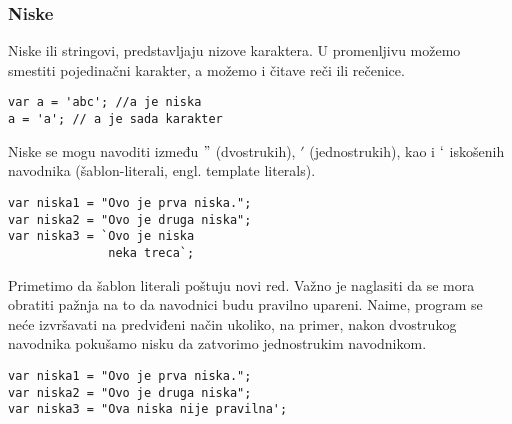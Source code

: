 \subsubsection{Niske}
Niske ili stringovi, predstavljaju nizove karaktera. U promenljivu možemo smestiti pojedinačni karakter, a možemo i čitave reči ili rečenice. \\
\begin{lstlisting}[backgroundcolor = \color{lightgray}, breaklines=true]
var a = 'abc'; //a je niska
a = 'a'; // a je sada karakter
\end{lstlisting}
Niske se mogu navoditi između $"$ (dvostrukih), $'$ (jednostrukih), kao i $`$ iskošenih navodnika (šablon-literali, engl. template literals).  
\begin{lstlisting}[backgroundcolor = \color{lightgray}, breaklines=true]
var niska1 = "Ovo je prva niska.";
var niska2 = "Ovo je druga niska";
var niska3 = `Ovo je niska
              neka treca`;
\end{lstlisting}
Primetimo da šablon literali poštuju novi red. Važno je naglasiti da se mora obratiti pažnja na to da navodnici budu pravilno upareni. Naime, program se neće izvršavati na predviđeni način ukoliko, na primer, nakon dvostrukog navodnika pokušamo nisku da zatvorimo jednostrukim navodnikom.
\begin{lstlisting}[backgroundcolor = \color{lightgray}, breaklines=true]
var niska1 = "Ovo je prva niska.";
var niska2 = "Ovo je druga niska";
var niska3 = "Ova niska nije pravilna';
\end{lstlisting}

